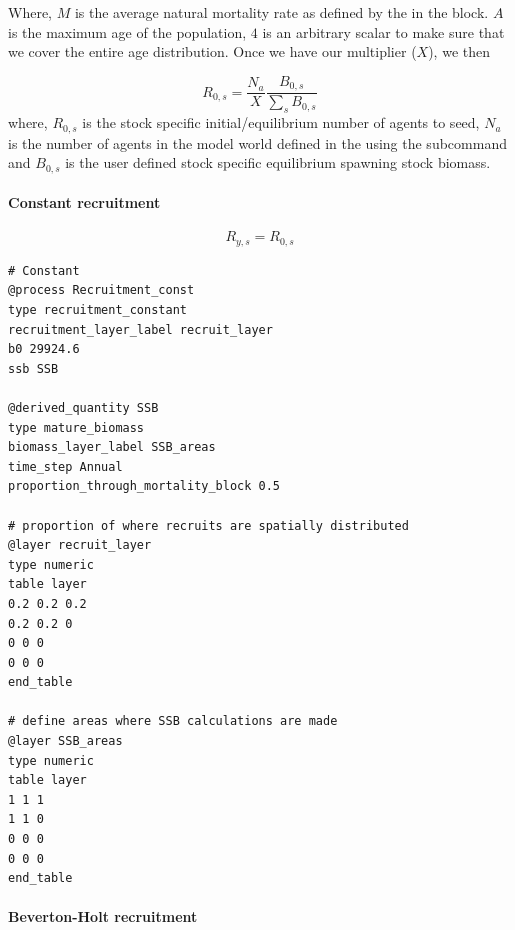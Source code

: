 Where, $M$ is the average natural mortality rate as defined by the  in the  block. $A$ is the maximum age of the population, $4$ is an arbitrary scalar to make sure that we cover the entire age distribution. Once we have our multiplier ($X$), we then


\begin{equation}
R_{0,s} = \frac{N_a}{X} \frac{B_{0,s}}{\sum_s B_{0,s}}
\end{equation}
where, $R_{0,s}$ is the stock specific initial/equilibrium number of agents to seed, $N_a$ is the number of agents in the model world defined in the  using the subcommand  and $B_{0,s}$ is the user defined stock specific equilibrium spawning stock biomass.

\paragraph{Constant recruitment}\label{subsubsec:constant-recruitment}

\begin{equation}
	R_{y,s} = R_{0,s}
\end{equation}

{\small{\begin{verbatim}
# Constant
@process Recruitment_const
type recruitment_constant
recruitment_layer_label recruit_layer
b0 29924.6 
ssb SSB

@derived_quantity SSB
type mature_biomass
biomass_layer_label SSB_areas
time_step Annual
proportion_through_mortality_block 0.5

# proportion of where recruits are spatially distributed
@layer recruit_layer
type numeric
table layer
0.2 0.2 0.2
0.2 0.2 0
0 0 0
0 0 0	
end_table

# define areas where SSB calculations are made
@layer SSB_areas
type numeric
table layer
1 1 1
1 1 0
0 0 0
0 0 0	
end_table
\end{verbatim}}}
	
\paragraph{Beverton-Holt recruitment}\label{subsubsec:bev-holt-recruitment}

